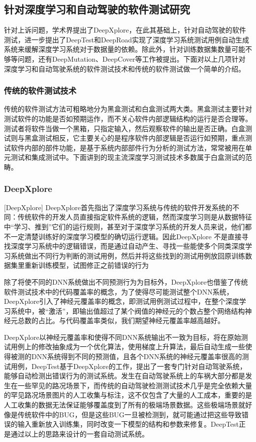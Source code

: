 \subsection{针对深度学习和自动驾驶的软件测试研究}

针对上诉问题，学术界提出了DeepXplore，在此其基础上，针对自动驾驶的软件测试，进一步提出了DeepTest和DeepRoad实现了深度学习系统测试用例自动生成系统来缓解深度学习系统对于数据量的依赖。除此外，针对训练数据集数量可能不够等问题，还有DeepMutation\cite{DeepMutation}、DeepCover\cite{DeepCover}等工作被提出。下面对以上几项针对深度学习和自动驾驶系统的软件测试技术和传统的软件测试做一个简单的介绍。

\subsubsection{传统的软件测试技术}

传统的软件测试方法可粗略地分为黑盒测试和白盒测试两大类。黑盒测试主要针对测试软件的功能是否如预期运作，而不关心软件内部逻辑结构的运行是否合理等。测试者将软件当做一个黑箱，只指定输入，然后观察软件的输出是否正确。白盒测试则与黑盒测试相反，它主要关心的是程序软件内部逻辑是否运行如预期，重点测试软件内部的部件功能，是基于系统内部部件行为分析的测试方法，常常被用在单元测试和集成测试中。下面讲到的现主流深度学习测试技术多数属于白盒测试的范畴。

\subsubsection{DeepXplore}[DeepXplore]
DeepXplore首先指出了深度学习系统与传统的软件开发系统的不同：传统软件的开发人员直接指定软件系统的逻辑，然而深度学习则是从数据特征中“学习、推到”它们的运行规则，甚至对于深度学习系统的开发人员来说，他们都不一定清楚训练好的深度学习模型的确切运行逻辑。因此DeepXplore
不是直接寻找深度学习系统中的逻辑错误，而是通过自动产生、寻找一些能使多个同类深度学习系统做出不同行为判断的测试用例，然后并将这些找到的测试用例放回原训练数据集里重新训练模型，试图修正之前错误的行为

除了将使不同的DNN系统做出不同预测行为为目标外，DeepXplore也借鉴了传统软件测试技术中的代码覆盖率的概念，为了使得尽可能测试整个DNN系统，DeepXplore引入了神经元覆盖率的概念，即测试用例测试过程中，在整个深度学习系统中，被“激活”，即输出值超过了某个阀值的神经元的个数占整个网络结构神经元总数的占比。与代码覆盖率类似，我们期望神经元覆盖率越高越好。

DeepXplore以神经元覆盖率和使得不同DNN系统输出不一致为目标，将在原始测试用例上的修改抽象成为一个优化算法，使用梯度上升算法，最后自动生成一些使得被测的DNN系统得到不同的预测值，且各个DNN系统的神经元覆盖率很高的测试用例，DeepTest基于DeepXplore的工作，提出了一套专门针对自动驾驶系统，能够自动检测出错误行为的测试系统。发生在自动驾驶系统上的车祸大部分都是发生在一些罕见的路况场景下，而传统的自动驾驶检测测试技术几乎是完全依赖大量的罕见路况场景图片的人工收集与标注，这不仅包含了大量的人工成本，重要的是人工收集的数据无法保证能够覆盖度到了所有的极端场景数据。这些极端场景就好像是传统软件中的BUG，但是这些BUG一旦被检测到，就可能通过把这些导致错误的输入重新放入训练集，同时改变一下模型的结构和参数来修复。DeepTest正是通过以上的思路来设计的一套自动测试系统。

